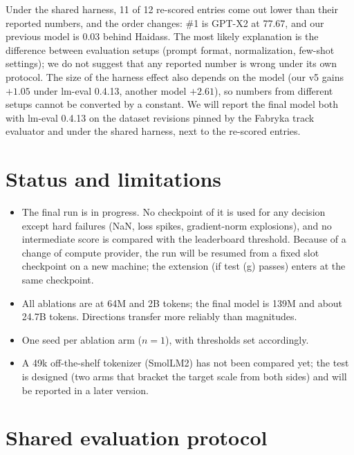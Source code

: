 Under the shared harness, 11 of 12 re-scored entries come out lower than their reported numbers, and the order
changes: \#1 is GPT-X2 at 77.67, and our previous model is 0.03 behind Haidass. The most likely explanation is the
difference between evaluation setups (prompt format, normalization, few-shot settings); we do not suggest that any
reported number is wrong under its own protocol. The size of the harness effect also depends on the model (our v5
gains $+1.05$ under lm-eval 0.4.13, another model $+2.61$), so numbers from different setups cannot be converted by a
constant. We will report the final model both with lm-eval 0.4.13 on the dataset revisions pinned by the Fabryka
track evaluator and under the shared harness, next to the re-scored entries.

\section{Status and limitations}

\begin{itemize}
  \item The final run is in progress. No checkpoint of it is used for any decision except hard failures (NaN, loss
  spikes, gradient-norm explosions), and no intermediate score is compared with the leaderboard threshold. Because of
  a change of compute provider, the run will be resumed from a fixed slot checkpoint on a new machine; the extension
  (if test (g) passes) enters at the same checkpoint.
  \item All ablations are at 64M and 2B tokens; the final model is 139M and about 24.7B tokens. Directions transfer more
  reliably than magnitudes.
  \item One seed per ablation arm ($n = 1$), with thresholds set accordingly.
  \item A 49k off-the-shelf tokenizer (SmolLM2) has not been compared yet; the test is designed (two arms that bracket
  the target scale from both sides) and will be reported in a later version.
\end{itemize}

\appendix
\section{Shared evaluation protocol}
\label{app:protocol}

